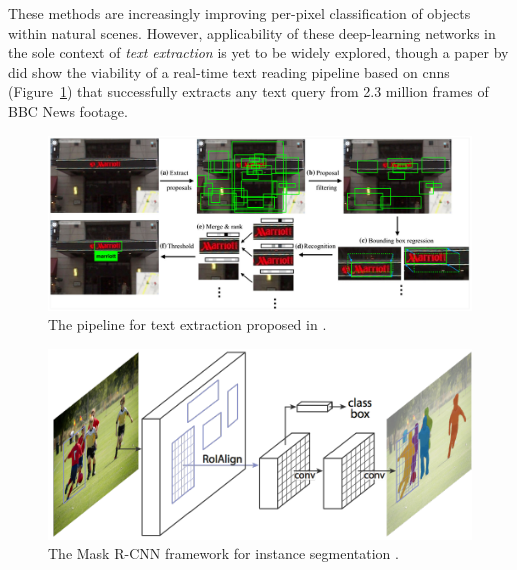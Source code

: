 These methods are increasingly improving per-pixel classification of objects within natural scenes. However, applicability of these deep-learning networks in the sole context of \textit{text extraction} is yet to be widely explored, though a \citeyear{Jaderberg:2016wj} paper by \citet{Jaderberg:2016wj} did show the viability of a real-time text reading pipeline based on \glspl{cnn} (Figure~\ref{fig:background:detection:learning:jaderberg2016_cnn}) that successfully extracts any text query from 2.3 million frames of BBC News footage.

\begin{figure}[h]
  \centering 
  \includegraphics[width=\textwidth]{images/background/jaderberg2016_cnn}
  \caption[A pipeline for text extraction using CNNs]{The pipeline for text extraction proposed in \citep{Jaderberg:2016wj}.}
  \label{fig:background:detection:learning:jaderberg2016_cnn}
\end{figure}

\begin{figure}[p]
  \centering
  \includegraphics[width=\textwidth]{images/background/he2017_maskrcnnframework}
  \caption[The Mask R-CNN framework for instance segmentation]{The Mask R-CNN framework for instance segmentation \citep{He:2017ud}.}
  \label{fig:background:detection:learning:he2017_maskrcnnframework}
\end{figure}

